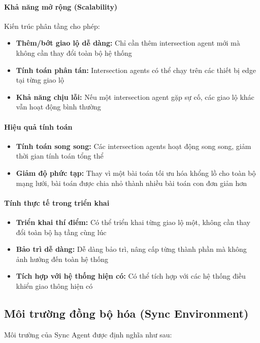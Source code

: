 \paragraph{Khả năng mở rộng (Scalability)}
Kiến trúc phân tầng cho phép:
\begin{itemize}
    \item \textbf{Thêm/bớt giao lộ dễ dàng:} Chỉ cần thêm intersection agent mới mà không cần thay đổi toàn bộ hệ thống
    \item \textbf{Tính toán phân tán:} Intersection agents có thể chạy trên các thiết bị edge tại từng giao lộ
    \item \textbf{Khả năng chịu lỗi:} Nếu một intersection agent gặp sự cố, các giao lộ khác vẫn hoạt động bình thường
\end{itemize}

\paragraph{Hiệu quả tính toán}
\begin{itemize}
    \item \textbf{Tính toán song song:} Các intersection agents hoạt động song song, giảm thời gian tính toán tổng thể
    \item \textbf{Giảm độ phức tạp:} Thay vì một bài toán tối ưu hóa khổng lồ cho toàn bộ mạng lưới, bài toán được chia nhỏ thành nhiều bài toán con đơn giản hơn
\end{itemize}

\paragraph{Tính thực tế trong triển khai}
\begin{itemize}
    \item \textbf{Triển khai thí điểm:} Có thể triển khai từng giao lộ một, không cần thay đổi toàn bộ hạ tầng cùng lúc
    \item \textbf{Bảo trì dễ dàng:} Dễ dàng bảo trì, nâng cấp từng thành phần mà không ảnh hưởng đến toàn hệ thống
    \item \textbf{Tích hợp với hệ thống hiện có:} Có thể tích hợp với các hệ thống điều khiển giao thông hiện có
\end{itemize}

\subsection{Môi trường đồng bộ hóa (Sync Environment)}
Môi trường của Sync Agent được định nghĩa như sau:


